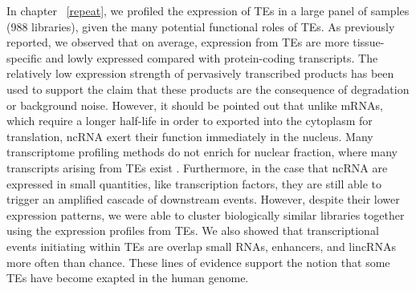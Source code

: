 In chapter ~\ref{repeat}, we profiled the expression of TEs in a large panel of samples (988 libraries), given the many potential functional roles of TEs. As previously reported, we observed that on average, expression from TEs are more tissue-specific and lowly expressed compared with protein-coding transcripts. The relatively low expression strength of pervasively transcribed products has been used to support the claim that these products are the consequence of degradation or background noise. However, it should be pointed out that unlike mRNAs, which require a longer half-life in order to exported into the cytoplasm for translation, ncRNA exert their function immediately in the nucleus. Many transcriptome profiling methods do not enrich for nuclear fraction, where many transcripts arising from TEs exist \citep{pmid24777452}. Furthermore, in the case that ncRNA are expressed in small quantities, like transcription factors, they are still able to trigger an amplified cascade of downstream events. However, despite their lower expression patterns, we were able to cluster biologically similar libraries together using the expression profiles from TEs. We also showed that transcriptional events initiating within TEs are overlap small RNAs, enhancers, and lincRNAs more often than chance. These lines of evidence support the notion that some TEs have become exapted in the human genome.
